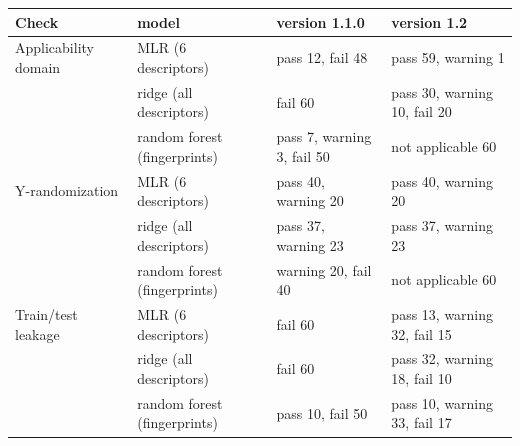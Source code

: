 \begin{tabular}{llll}
\toprule
Check & model & version 1.1.0 & version 1.2 \\
\midrule
Applicability domain & MLR (6 descriptors) & pass 12, fail 48 & pass 59, warning 1 \\
 & ridge (all descriptors) & fail 60 & pass 30, warning 10, fail 20 \\
 & random forest (fingerprints) & pass 7, warning 3, fail 50 & not applicable 60 \\
\addlinespace
Y-randomization & MLR (6 descriptors) & pass 40, warning 20 & pass 40, warning 20 \\
 & ridge (all descriptors) & pass 37, warning 23 & pass 37, warning 23 \\
 & random forest (fingerprints) & warning 20, fail 40 & not applicable 60 \\
\addlinespace
Train/test leakage & MLR (6 descriptors) & fail 60 & pass 13, warning 32, fail 15 \\
 & ridge (all descriptors) & fail 60 & pass 32, warning 18, fail 10 \\
 & random forest (fingerprints) & pass 10, fail 50 & pass 10, warning 33, fail 17 \\
\bottomrule
\end{tabular}
